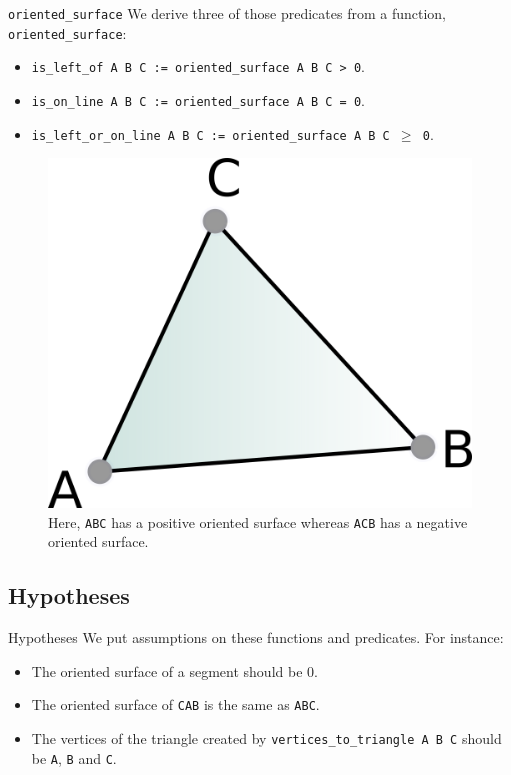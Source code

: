 \documentclass[18pt]{beamer}
\begin{document}
\begin{frame}{\tt oriented\_surface}
We derive three of those predicates from a function, {\tt oriented\_surface}:
{\small   \begin{itemize}
\item<2-> {\tt is\_left\_of A B C := oriented\_surface A B C > 0}.
  \item<3-> {\tt is\_on\_line A B C := oriented\_surface A B C = 0}.
  \item<4-> {\tt is\_left\_or\_on\_line A B C := oriented\_surface A B C $\geq$ 0}.

 \end{itemize} }


  \begin{figure}
  \centering
  \includegraphics[scale=1]{Surface}
  \caption{\label{surface} Here, {\tt ABC} has a positive oriented surface whereas {\tt ACB} has a negative oriented surface.}
\end{figure}


\end{frame}


\subsection{Hypotheses}

\begin{frame}{Hypotheses}
 We put assumptions on these functions and predicates. For instance:
 \begin{itemize}
  \item<1-> The oriented surface of a segment should be 0.
  \item<2-> The oriented surface of {\tt CAB} is the same as {\tt ABC}.
  \item<3-> The vertices of the triangle created by {\tt vertices\_to\_triangle A B C} should be  {\tt A}, {\tt B} and {\tt C}.
 \end{itemize}

\end{frame}
\end{document}

